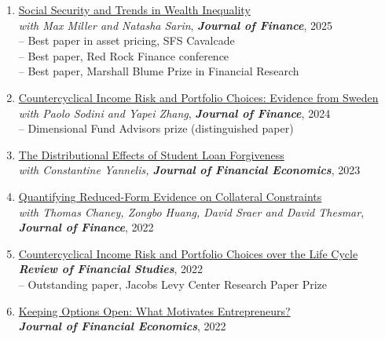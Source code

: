 \documentclass[6pt,letterpaper]{article}
\begin{document}
\begin{enumerate}	
	\item \href{https://onlinelibrary.wiley.com/doi/abs/10.1111/jofi.13440}{Social Security and Trends in Wealth Inequality} \vspace{.1cm} \\
	{\small  \textit{with Max Miller and Natasha Sarin}, \textit{\textbf{Journal of Finance}}, 2025}  \\
	{\small -- Best paper in asset pricing, SFS Cavalcade } \\
	{\small -- Best paper, Red Rock Finance conference } \\
	{\small -- Best paper, Marshall Blume Prize in Financial Research } 
	\item \href{https://onlinelibrary.wiley.com/doi/abs/10.1111/jofi.13341}{Countercyclical Income Risk and Portfolio Choices: Evidence from Sweden} \vspace{.1cm} \\
	{\small  \textit{with Paolo Sodini and Yapei Zhang}, \textit{\textbf{Journal of Finance}}, 2024 } \\
	{\small -- Dimensional Fund Advisors prize (distinguished paper)}
	\item \href{https://www.sciencedirect.com/science/article/abs/pii/S0304405X22002239}{The Distributional Effects of Student Loan Forgiveness} \vspace{.1cm} \\
	{\small  \textit{with Constantine Yannelis, \textbf{Journal of Financial Economics}}, 2023 }
	\item \href{https://onlinelibrary.wiley.com/doi/full/10.1111/jofi.13158}{Quantifying Reduced-Form Evidence on Collateral Constraints} \vspace{.1cm} \\
	{\small  \textit{with Thomas Chaney, Zongbo Huang, David Sraer and David Thesmar}}, {\small  \textbf{\textit{Journal of Finance}}, 2022} \vspace{.1cm} 
	\item {\href{https://academic.oup.com/rfs/article-abstract/35/9/4016/6482757}{Countercyclical Income Risk and Portfolio Choices over the Life Cycle}}\vspace{.1cm} \\ {\small  \textit{\textbf{Review of Financial Studies}}, 2022 } \vspace{0.1cm} \\
	{\small -- Outstanding paper, Jacobs Levy Center Research Paper Prize } 
	\item {\href{https://www.sciencedirect.com/science/article/abs/pii/S0304405X22000010}{Keeping Options Open: What Motivates Entrepreneurs?}} \vspace{.1cm} \\ {\small \textit{\textbf{Journal of Financial Economics}}, 2022}\vspace{0.1cm} \\

\end{enumerate}
\end{document}
